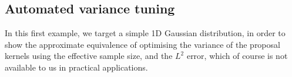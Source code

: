 \documentclass[final]{siamltex}
\begin{document}





\subsection{Automated variance tuning}
\label{sec:problem 1}
{\red In this first example, we target a simple 1D Gaussian distribution, in
order to show the approximate equivalence of optimising the variance
of the proposal kernels using the effective sample size, and the $L^2$
error, which of course is not available to us in practical
applications.}
\end{document}
